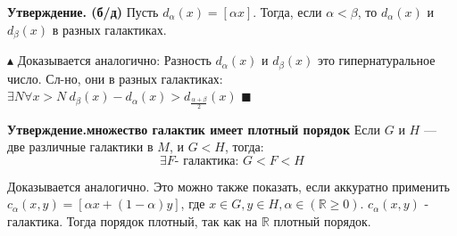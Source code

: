 \textbf{Утверждение. (б/д)} Пусть $d_{\alpha}(x) = [\alpha x]$. Тогда, если $\alpha < \beta$, то $d_{\alpha}(x)$ и $d_{\beta}(x)$ в разных галактиках.

$\blacktriangle$
Доказывается аналогично: Разность $d_{\alpha}(x)$ и $d_{\beta}(x)$ это гипернатуральное число. Сл-но, они в разных галактиках:
$\exists N \forall x > N \ d_{\beta}(x) - d_{\alpha}(x) > d_{\frac{\alpha + \beta}{2}}(x)$
$\blacksquare$

\textbf{Утверждение.множество галактик имеет плотный порядок}
Если $G$ и $H$ — две различные галактики в $M$, и $G < H$, тогда:
$$\exists F \text{- галактика: } G < F < H$$

Доказывается аналогично. Это можно также показать, если аккуратно применить $c_{\alpha}(x, y) = [\alpha x + (1 - \alpha) y]$, где $x \in G, y \in H, \alpha \in (\mathbb{R} \geq 0)$. $c_{\alpha}(x, y)$ - галактика. Тогда порядок плотный, так как на $\mathbb{R}$ плотный порядок.